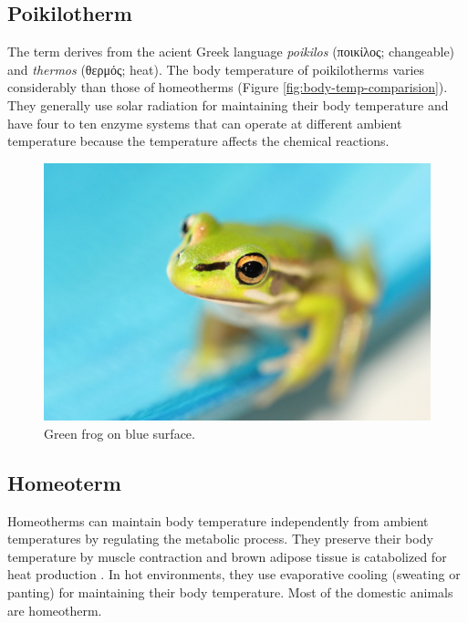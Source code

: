 \documentclass[]{book}
\begin{document}
\subsection{Poikilotherm}\label{poikilotherm}

The term derives from the acient Greek language \emph{poikilos}
(ποικίλος; changeable) and \emph{thermos} (θερμός; heat). The body
temperature of poikilotherms varies considerably than those of
homeotherms (Figure \ref{fig:body-temp-comparision}). They generally use
solar radiation for maintaining their body temperature and have four to
ten enzyme systems that can operate at different ambient temperature
because the temperature affects the chemical reactions.

\begin{figure}

{\centering \includegraphics[width=1\linewidth]{figures/flog} 

}

\caption{Green frog on blue surface.}\label{fig:flor}
\end{figure}

\subsection{Homeoterm}\label{homeoterm}

Homeotherms can maintain body temperature independently from ambient
temperatures by regulating the metabolic process. They preserve their
body temperature by muscle contraction and brown adipose tissue is
catabolized for heat production \citep{grigg2004evolution}. In hot
environments, they use evaporative cooling (sweating or panting) for
maintaining their body temperature. Most of the domestic animals are
homeotherm.
\end{document}

